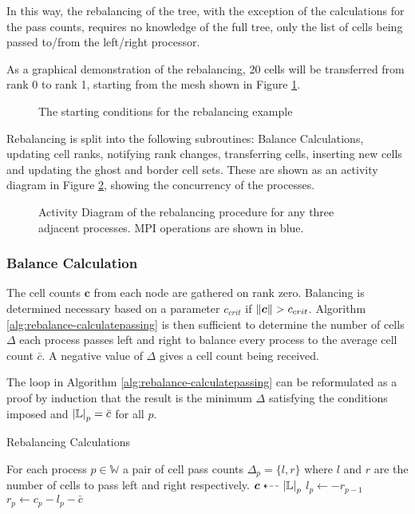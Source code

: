 \documentclass{IIBproject}
\newcommand{\grpath}{../../build/report}
\newcommand{\vect}[1]{\bm{#1}}
\newcommand{\dla}{\dashleftarrow}
\begin{document}
In this way, the rebalancing of the tree, with the exception of the calculations for the pass counts, requires no knowledge of the full tree, only the list of cells being passed to/from the left/right processor. 

As a graphical demonstration of the rebalancing, 20 cells will be transferred from rank 0 to rank 1, starting from the mesh shown in Figure \ref{fig:rebalance-init}.

\begin{figure}[H]
	\label{fig:rebalance-init}
	\caption{The starting conditions for the rebalancing example}
	
\end{figure}

Rebalancing is split into the following subroutines: Balance Calculations, updating cell ranks, notifying rank changes, transferring cells, inserting new cells and updating the ghost and border cell sets. These are shown as an activity diagram in Figure \ref{fig:rebalance-overview}, showing the concurrency of the processes.

\begin{figure}[H]
	\label{fig:rebalance-overview}
	\caption{Activity Diagram of the rebalancing procedure for any three adjacent processes. MPI operations are shown in blue.}
	
\end{figure}


\subsubsection{Balance Calculation}
\label{sec:rebalancing-calc}

The cell counts $\vect{c}$ from each node are gathered on rank zero. Balancing is determined necessary based on a parameter $c_{crit}$ if $\norm{\vect{c}}>c_{crit}$. Algorithm \ref{alg:rebalance-calculatepassing} is then sufficient to determine the number of cells $\Delta$ each process passes left and right to balance every process to the average cell count $\bar c$. A negative value of $\Delta$ gives a cell count being received. 

The loop in Algorithm \ref{alg:rebalance-calculatepassing} can be reformulated as a proof by induction that the result is the minimum $\Delta$ satisfying the conditions imposed and $\abs{\mathbb{L}}_p=\bar c$ for all $p$.

\begin{algorithm}[H]
\caption{Rebalancing Calculations}
\label{alg:rebalance-calculatepassing}

\begin{algorithmic}
\Ensure For each process $p \in \mathbb{W}$ a pair of cell pass counts $\Delta_p = \{l,r\}$ where $l$ and $r$ are the number of cells to pass left and right respectively.
\Statex
\Gather $\vect{c} \dla \abs{\mathbb{L}}_p $
	\State $l_p \gets -r_{p-1}$
	\State $r_p \gets c_p - l_p - \bar{c}$
\EndFor
\end{algorithmic}
\end{algorithm}
\end{document}
